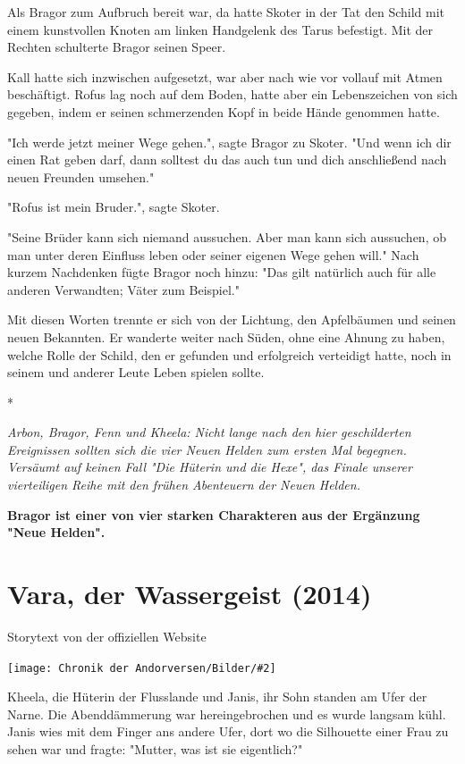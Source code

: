 \documentclass[10pt, a4paper, oneside]{book}
\newcommand{\fillbreak}{\vspace*{\fill}\columnbreak}
\newcommand{\storytext}[1]{%
    \section{#1}%
    \label{Storytext: #1}%
}
\newcommand{\bildmitts}[2][height=0.32\textwidth,width=0.48\textwidth,keepaspectratio]{%
    \begin{center}
        \texttt{[image: Chronik der Andorversen/Bilder/\#2]}
    \end{center}
}
\begin{document}
\begin{multicols}{2}
Als Bragor zum Aufbruch bereit war, da hatte Skoter in der Tat den Schild mit einem kunstvollen Knoten am linken Handgelenk des Tarus befestigt. Mit der Rechten schulterte Bragor seinen Speer. 

Kall hatte sich inzwischen aufgesetzt, war aber nach wie vor vollauf mit Atmen beschäftigt. Rofus lag noch auf dem Boden, hatte aber ein Lebenszeichen von sich gegeben, indem er seinen schmerzenden Kopf in beide Hände genommen hatte. 

"Ich werde jetzt meiner Wege gehen.", sagte Bragor zu Skoter. "Und wenn ich dir einen Rat geben darf, dann solltest du das auch tun und dich anschließend nach neuen Freunden umsehen." 

"Rofus ist mein Bruder.", sagte Skoter. 

"Seine Brüder kann sich niemand aussuchen. Aber man kann sich aussuchen, ob man unter deren Einfluss leben oder seiner eigenen Wege gehen will." Nach kurzem Nachdenken fügte Bragor noch hinzu: "Das gilt natürlich auch für alle anderen Verwandten; Väter zum Beispiel." 

Mit diesen Worten trennte er sich von der Lichtung, den Apfelbäumen und seinen neuen Bekannten. Er wanderte weiter nach Süden, ohne eine Ahnung zu haben, welche Rolle der Schild, den er gefunden und erfolgreich verteidigt hatte, noch in seinem und anderer Leute Leben spielen sollte. 

\begin{center}
    * 
\end{center}

\textit{Arbon, Bragor, Fenn und Kheela: Nicht lange nach den hier geschilderten Ereignissen sollten sich die vier Neuen Helden zum ersten Mal begegnen. Versäumt auf keinen Fall "Die Hüterin und die Hexe", das Finale unserer vierteiligen Reihe mit den frühen Abenteuern der Neuen Helden.}\bigskip

\textbf{Bragor ist einer von vier starken Charakteren aus der Ergänzung "Neue Helden".} 






\fillbreak
\storytext{Vara, der Wassergeist (2014)}

\begin{center}
    Storytext von der offiziellen Website
\end{center}

\bildmitts{Vara der Wassergeist Bild 1.jpg}

Kheela, die Hüterin der Flusslande und Janis, ihr Sohn standen am Ufer der Narne. Die Abenddämmerung war hereingebrochen und es wurde langsam kühl. Janis wies mit dem Finger ans andere Ufer, dort wo die Silhouette einer Frau zu sehen war  und fragte: "Mutter, was ist sie eigentlich?"


\end{multicols}
\end{document}
